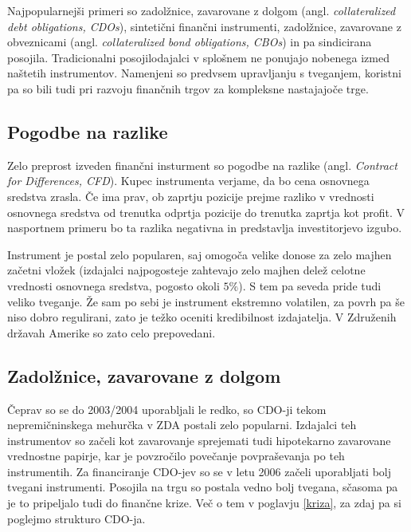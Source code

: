 \documentclass[12pt,a4paper]{amsart}
\theoremstyle{definition} %
\theoremstyle{plain} %
\begin{document}
Najpopularnejši primeri so zadolžnice, zavarovane z dolgom (angl. \textit{collateralized 
debt obligations, CDOs}),	sintetični finančni instrumenti, zadolžnice, zavarovane z 
obveznicami (angl. \textit{collateralized bond obligations, CBOs})
in pa sindicirana posojila. Tradicionalni posojilodajalci v splošnem ne ponujajo nobenega 
izmed naštetih instrumentov. Namenjeni so predvsem upravljanju s tveganjem, 
koristni pa so bili tudi pri razvoju finančnih trgov za kompleksne nastajajoče trge.

\subsection{Pogodbe na razlike}
Zelo preprost izveden finančni insturment so pogodbe na razlike (angl. \textit{
Contract for Differences, CFD}). Kupec instrumenta verjame, da bo cena osnovnega 
sredstva zrasla. Če ima prav, ob zaprtju pozicije prejme razliko v vrednosti 
osnovnega sredstva od trenutka odprtja pozicije do trenutka zaprtja kot profit. 
V nasportnem primeru bo ta razlika negativna in predstavlja investitorjevo izgubo. 

Instrument je postal zelo popularen, saj omogoča velike donose za zelo majhen 
začetni vložek (izdajalci najpogosteje zahtevajo zelo majhen delež celotne vrednosti 
osnovnega sredstva, pogosto okoli $5\%$). S tem pa seveda pride tudi veliko 
tveganje. Že sam po sebi je instrument ekstremno volatilen, za povrh pa še niso 
dobro regulirani, zato je težko oceniti kredibilnost izdajatelja. V Združenih državah 
Amerike so zato celo prepovedani.

\subsection{Zadolžnice, zavarovane z dolgom}
Čeprav so se do 2003/2004 uporabljali le redko, so CDO-ji tekom nepremičninskega 
mehurčka v ZDA postali zelo popularni. Izdajalci teh instrumentov so začeli kot 
zavarovanje sprejemati tudi hipotekarno zavarovane vrednostne papirje, kar je 
povzročilo povečanje povpraševanja po teh instrumentih. Za financiranje CDO-jev 
so se v letu 2006 začeli uporabljati bolj tvegani instrumenti. Posojila na 
trgu so postala vedno bolj tvegana, sčasoma pa je to pripeljalo tudi do finančne 
krize. Več o tem v poglavju \ref{kriza}, za zdaj pa si poglejmo strukturo CDO-ja.	 
\end{document}
